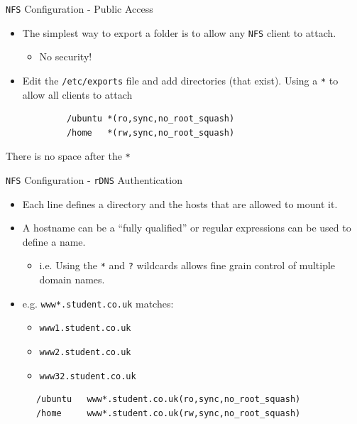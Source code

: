 \documentclass[xcolor=table,aspectratio=169]{beamer}
\begin{document}
\begin{frame}[fragile]{\texttt{NFS} Configuration - Public Access}
  \begin{itemize}
    \item The simplest way to export a folder is to allow any \texttt{NFS} client to attach.
      \begin{itemize}
        \item No security!
      \end{itemize}
    \item Edit the \texttt{/etc/exports} file and add directories (that exist). Using a \texttt{*} to allow all clients to attach
  \end{itemize}
  \begin{tcolorbox}
    \lstset{
      basicstyle=\tiny\ttfamily,
    }
    \begin{lstlisting}
            /ubuntu	*(ro,sync,no_root_squash)
            /home 	*(rw,sync,no_root_squash)
    \end{lstlisting}
  \end{tcolorbox}
  \begin{tcolorbox}[title={\textbf{IMPORTANT}}]
    \begin{center}
      There is no space after the \texttt{*}
    \end{center}
  \end{tcolorbox}

\end{frame}

\begin{frame}[fragile]{\texttt{NFS} Configuration - \texttt{rDNS} Authentication}
  \begin{itemize}
    \item Each line defines a directory and the hosts that are allowed to mount it. 
    \item A hostname can be a ``fully qualified'' or regular expressions can be used to define a name.
      \begin{itemize}
        \item i.e. Using the \texttt{*} and \texttt{?} wildcards allows fine grain control of multiple domain names.
      \end{itemize}
    \item e.g. \texttt{www*.student.co.uk} matches:
      \begin{itemize}
        \item \texttt{www1.student.co.uk}
        \item \texttt{www2.student.co.uk}
        \item \texttt{www32.student.co.uk}
      \end{itemize}
  \end{itemize}
  \begin{tcolorbox}
    \lstset{
      basicstyle=\tiny\ttfamily,
    }
    \begin{lstlisting}
      /ubuntu	www*.student.co.uk(ro,sync,no_root_squash)
      /home 	www*.student.co.uk(rw,sync,no_root_squash)
    \end{lstlisting}
  \end{tcolorbox}
\end{frame}
\end{document}
